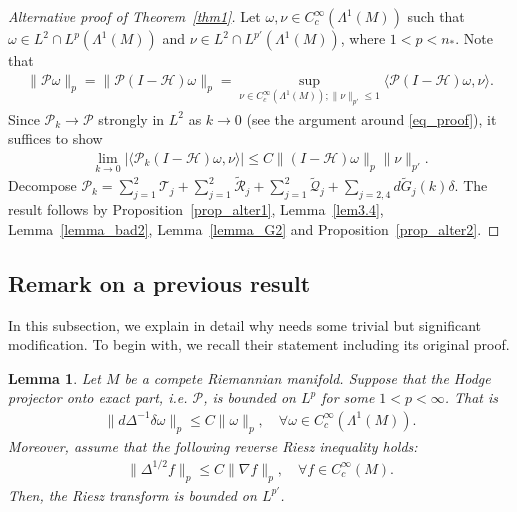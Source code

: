 \documentclass[12pt]{amsart}
\newtheorem{lemma}[theorem]{Lemma}
\begin{document}
\begin{proof}[Alternative proof of Theorem~\ref{thm1}]
Let $\omega, \nu \in C_c^\infty(\Lambda^1(M))$ such that $\omega \in L^2 \cap L^p(\Lambda^1(M))$ and $\nu\in L^2\cap L^{p'}(\Lambda^1(M))$, where $1<p<n_*$. Note that
\begin{align*}
    \|\mathcal{P}\omega\|_p = \| \mathcal{P}(I-\mathcal{H})\omega\|_p = \sup_{\nu \in C_c^\infty(\Lambda^1(M)); \|\nu\|_{p'}\le 1} \langle \mathcal{P}(I-\mathcal{H})\omega, \nu \rangle.
\end{align*}
Since $\mathcal{P}_k \to \mathcal{P}$ strongly in $L^2$ as $k \to 0$ (see the argument around \eqref{eq_proof}), it suffices to show
\begin{align*}
    \lim_{k\to 0} \left| \langle \mathcal{P}_k(I-\mathcal{H})\omega, \nu \rangle \right| \le C \|(I-\mathcal{H})\omega\|_p \|\nu\|_{p'}.
\end{align*}
Decompose $\mathcal{P}_k = \sum_{j=1}^2 \mathcal{T}_j + \sum_{j=1}^2 \tilde{\mathcal{R}}_j + \sum_{j=1}^2 \tilde{\mathcal{Q}}_j + \sum_{j=2,4} d \tilde{G}_j(k) \delta$. The result follows by Proposition~\ref{prop_alter1}, Lemma~\ref{lem3.4}, Lemma~\ref{lemma_bad2}, Lemma~\ref{lemma_G2} and Proposition~\ref{prop_alter2}. 

\end{proof}






\subsection{Remark on a previous result}

In this subsection, we explain in detail why \cite[Lemma~0.1]{AC} needs some trivial but significant modification. To begin with, we recall their statement including its original proof.

\begin{lemma}\cite[Lemma~0.1]{AC}\label{le_AC}
Let $M$ be a compete Riemannian manifold. Suppose that the Hodge projector onto exact part, i.e. $\mathcal{P}$, is bounded on $L^p$ for some $1<p<\infty$. That is 
\begin{align*}
    \|d \Delta^{-1} \delta \omega \|_p \le C \|\omega\|_p, \quad \forall \omega \in C_c^\infty(\Lambda^1(M)).
\end{align*}
Moreover, assume that the following reverse Riesz inequality holds:
\begin{align*}
    \|\Delta^{1/2}f\|_p \le C \|\nabla f\|_p, \quad \forall f\in C_c^\infty(M).
\end{align*}
Then, the Riesz transform is bounded on $L^{p'}$.
\end{lemma}
\end{document}
